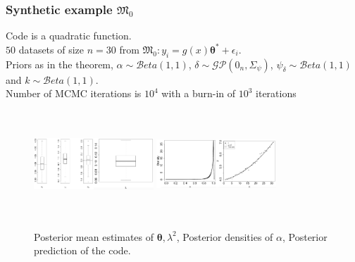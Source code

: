 \documentclass[nopagenumber,9pt]{beamer}
\newcommand{\btheta}{\boldsymbol{\theta}}
\newcommand\MF{{\mathfrak{M}}}
\begin{document}
 
 
 \begin{frame}
  \frametitle{Synthetic example $\MF_0$}
  Code is a quadratic function.\\
  $50$ datasets of size $n=30$ from $\MF_0: y_i=g(x)\pmb{\theta}^*+\epsilon_i$. \\
  Priors as in the theorem, $\alpha\sim \mathcal{B}eta(1,1)$, $\delta\sim \mathcal{GP}(0_n, \Sigma_\psi)$, $\psi_\delta \sim \mathcal{B}eta(1,1)$ and  $k \sim \mathcal{B}eta(1,1)$.  \\
  Number of MCMC iterations is $10^4$ with a burn-in of $10^3$ iterations
  
\begin{figure}[ht]
\includegraphics[width=0.2\textwidth,height=4cm]{m0_theta_50data_n_30_gamadelta_0_9}\includegraphics[width=0.2\textwidth,height=4cm]{m0_lamda_50data_n_30_gamadelta_0_9}
\includegraphics[width=0.2\textwidth,height=4cm]{m0_alpha_50data_n_30_gamadelta_0_9}\includegraphics[width=0.2\textwidth,height=4cm]{m0_model_50data_n_30_gamadelta_0_9}
\caption{Posterior mean estimates of $\btheta,\lambda^2$, Posterior densities of $\alpha$, Posterior prediction of the code.}
  \end{figure}

 \end{frame}
\end{document}
